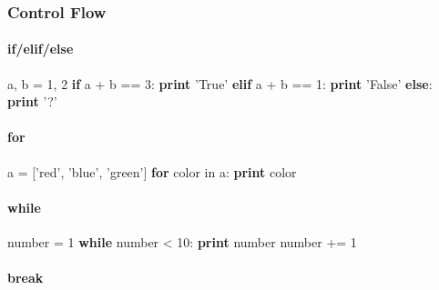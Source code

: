 \documentclass[]{article}
\newenvironment{Shaded}{}{}
\newcommand{\KeywordTok}[1]{\textcolor[rgb]{0.00,0.44,0.13}{\textbf{{#1}}}}
\newcommand{\DecValTok}[1]{\textcolor[rgb]{0.25,0.63,0.44}{{#1}}}
\newcommand{\StringTok}[1]{\textcolor[rgb]{0.25,0.44,0.63}{{#1}}}
\newcommand{\NormalTok}[1]{{#1}}
\begin{document}
\subsubsection{Control Flow}

\paragraph{if/elif/else}

\begin{Shaded}
\begin{Highlighting}[]
\NormalTok{a, b = }\DecValTok{1}\NormalTok{, }\DecValTok{2}
\KeywordTok{if} \NormalTok{a + b == }\DecValTok{3}\NormalTok{:}
    \KeywordTok{print} \StringTok{'True'}
\KeywordTok{elif} \NormalTok{a + b == }\DecValTok{1}\NormalTok{:}
    \KeywordTok{print} \StringTok{'False'}
\KeywordTok{else}\NormalTok{:}
    \KeywordTok{print} \StringTok{'?'}
\end{Highlighting}
\end{Shaded}

\paragraph{for}

\begin{Shaded}
\begin{Highlighting}[]
\NormalTok{a = [}\StringTok{'red'}\NormalTok{, }\StringTok{'blue'}\NormalTok{,}
     \StringTok{'green'}\NormalTok{]}
\KeywordTok{for} \NormalTok{color in a:}
    \KeywordTok{print} \NormalTok{color}
\end{Highlighting}
\end{Shaded}

\paragraph{while}

\begin{Shaded}
\begin{Highlighting}[]
\NormalTok{number = }\DecValTok{1}
\KeywordTok{while} \NormalTok{number < }\DecValTok{10}\NormalTok{:}
    \KeywordTok{print} \NormalTok{number}
    \NormalTok{number += }\DecValTok{1}
\end{Highlighting}
\end{Shaded}

\paragraph{break}
\end{document}
